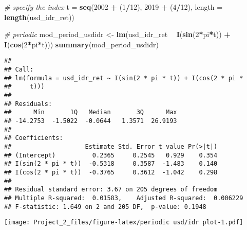 \documentclass[]{article}
\newenvironment{Shaded}{\begin{snugshade}}{\end{snugshade}}
\newcommand{\KeywordTok}[1]{\textcolor[rgb]{0.13,0.29,0.53}{\textbf{#1}}}
\newcommand{\DataTypeTok}[1]{\textcolor[rgb]{0.13,0.29,0.53}{#1}}
\newcommand{\DecValTok}[1]{\textcolor[rgb]{0.00,0.00,0.81}{#1}}
\newcommand{\StringTok}[1]{\textcolor[rgb]{0.31,0.60,0.02}{#1}}
\newcommand{\CommentTok}[1]{\textcolor[rgb]{0.56,0.35,0.01}{\textit{#1}}}
\newcommand{\OperatorTok}[1]{\textcolor[rgb]{0.81,0.36,0.00}{\textbf{#1}}}
\newcommand{\NormalTok}[1]{#1}
\begin{document}
\begin{Shaded}
\begin{Highlighting}[]
\CommentTok{# specify the index}
\NormalTok{t =}\StringTok{ }\KeywordTok{seq}\NormalTok{(}\DecValTok{2002} \OperatorTok{+}\StringTok{ }\NormalTok{(}\DecValTok{1}\OperatorTok{/}\DecValTok{12}\NormalTok{), }\DecValTok{2019} \OperatorTok{+}\StringTok{ }\NormalTok{(}\DecValTok{4}\OperatorTok{/}\DecValTok{12}\NormalTok{), }\DataTypeTok{length =} \KeywordTok{length}\NormalTok{(usd_idr_ret))}

\CommentTok{# periodic}
\NormalTok{mod_period_usdidr <-}\StringTok{ }\KeywordTok{lm}\NormalTok{(usd_idr_ret }\OperatorTok{~}\StringTok{ }\KeywordTok{I}\NormalTok{(}\KeywordTok{sin}\NormalTok{(}\DecValTok{2}\OperatorTok{*}\NormalTok{pi}\OperatorTok{*}\NormalTok{t)) }\OperatorTok{+}\StringTok{ }\KeywordTok{I}\NormalTok{(}\KeywordTok{cos}\NormalTok{(}\DecValTok{2}\OperatorTok{*}\NormalTok{pi}\OperatorTok{*}\NormalTok{t)))}
\KeywordTok{summary}\NormalTok{(mod_period_usdidr)}
\end{Highlighting}
\end{Shaded}

\begin{verbatim}
## 
## Call:
## lm(formula = usd_idr_ret ~ I(sin(2 * pi * t)) + I(cos(2 * pi * 
##     t)))
## 
## Residuals:
##      Min       1Q   Median       3Q      Max 
## -14.2753  -1.5022  -0.0644   1.3571  26.9193 
## 
## Coefficients:
##                    Estimate Std. Error t value Pr(>|t|)
## (Intercept)          0.2365     0.2545   0.929    0.354
## I(sin(2 * pi * t))  -0.5318     0.3587  -1.483    0.140
## I(cos(2 * pi * t))  -0.3765     0.3612  -1.042    0.298
## 
## Residual standard error: 3.67 on 205 degrees of freedom
## Multiple R-squared:  0.01583,    Adjusted R-squared:  0.006229 
## F-statistic: 1.649 on 2 and 205 DF,  p-value: 0.1948
\end{verbatim}

\begin{Shaded}
\end{Shaded}

\texttt{[image: Project\_2\_files/figure-latex/periodic usd/idr plot-1.pdf]}
\end{document}

